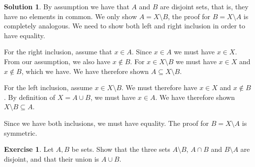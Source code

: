 \documentclass[a4paper, twocolumn]{report}
\newcounter{exercise} \numberwithin{exercise}{section}
\theoremstyle{definition}
\newtheorem{exc}[exercise]{Exercise}
\theoremstyle{solution}
\newtheorem*{sltn}{Solution}
\newcommand{\union}{\cup}
\newcommand{\intrsct}{\cap}
\begin{document}
\begin{sltn}
  By assumption we have that $A$ and $B$ are disjoint sets, that is, they have
  no elements in common.  We only show $A = X \setminus B$, the proof for $B =
  X \setminus A$ is completely analogous.  We need to show both left and right
  inclusion in order to have equality.

  For the right inclusion, assume that $x \in A$. Since $x \in A$ we must have
  $x \in X$.  From our assumption, we also have $x \notin B$. For $x \in X
  \setminus B$ we must have $x \in X$ and $x \notin B$, which we have.  We have
  therefore shown $A \subseteq X \setminus B$.

  For the left inclusion, assume $x \in X \setminus B$. We must therefore have
  $x \in X$ and $x \notin B$. By definition of $X = A \union B$, we must have
  $x \in A$. We have therefore shown $X \setminus B \subseteq A$.

  Since we have both inclusions, we must have equality.  The proof for $B = X
  \setminus A$ is symmetric.
\end{sltn}

\begin{exc}
  Let $A, B$ be sets. Show that the three sets $A \setminus B$, $A \intrsct B$
  and $B \setminus A$ are disjoint, and that their union is $A \union B$.
\end{exc}
\end{document}
